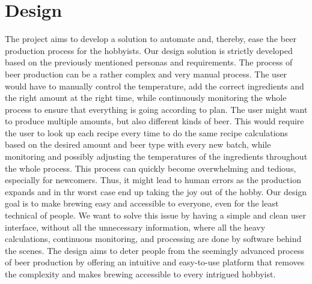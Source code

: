 \section{Design}
The project aims to develop a solution to automate and, thereby, ease the beer production process for the hobbyists. Our design solution is strictly developed based on the previously mentioned personas and requirements.\newline
The process of beer production can be a rather complex and very manual process. The user would have to manually control the temperature, add the correct ingredients and the right amount at the right time, while continuously monitoring the whole process to ensure that everything is going according to plan.\newline
The user might want to produce multiple amounts, but also different kinds of beer. This would require the user to look up each recipe every time to do the same recipe calculations based on the desired amount and beer type with every new batch, while monitoring and possibly adjusting the temperatures of the ingredients throughout the whole process.\newline
This process can quickly become overwhelming and tedious, especially for newcomers. Thus, it might lead to human errors as the production expands and in thr worst case end up taking the joy out of the hobby.\newline
Our design goal is to make brewing easy and accessible to everyone, even for the least technical of people. We want to solve this issue by having a simple and clean user interface, without all the unnecessary information, where all the heavy calculations, continuous monitoring, and processing are done by software behind the scenes.\newline
The design aims to deter people from the seemingly advanced process of beer production by offering an intuitive and easy-to-use platform that removes the complexity and makes brewing accessible to every intrigued hobbyist.

